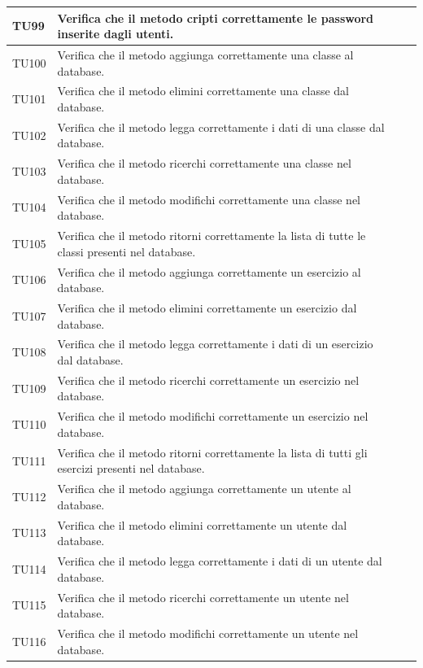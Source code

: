 \begin{longtable}{|>{\centering\arraybackslash}m{1.6cm}|>{\centering\arraybackslash}m{6.41cm}|>{\centering\arraybackslash}m{3.1cm}| c |}
		\rowcolor{LightGray}
		TU99 & Verifica che il metodo cripti correttamente le password inserite dagli utenti.  \\ \hline
		TU100 & Verifica che il metodo aggiunga correttamente una classe al database. \\ \hline
		\rowcolor{LightGray}
		TU101 & Verifica che il metodo elimini correttamente una classe dal database. \\ \hline
		TU102 & Verifica che il metodo legga correttamente i dati di una classe dal database. \\ \hline
		\rowcolor{LightGray}
		TU103 & Verifica che il metodo ricerchi correttamente una classe nel database. \\ \hline
		TU104 & Verifica che il metodo modifichi correttamente una classe nel database. \\ \hline
		\rowcolor{LightGray}
		TU105 & Verifica che il metodo ritorni correttamente la lista di tutte le classi presenti nel database.  \\ \hline	
		TU106 & Verifica che il metodo aggiunga correttamente un esercizio al database. \\ \hline
		\rowcolor{LightGray}
		TU107 & Verifica che il metodo elimini correttamente un esercizio dal database. \\ \hline
		TU108 & Verifica che il metodo legga correttamente i dati di un esercizio dal database. \\ \hline
		\rowcolor{LightGray}
		TU109 & Verifica che il metodo ricerchi correttamente un esercizio nel database. \\ \hline
		TU110 & Verifica che il metodo modifichi correttamente un esercizio nel database. \\ \hline
		\rowcolor{LightGray}
		TU111 & Verifica che il metodo ritorni correttamente la lista di tutti gli esercizi presenti nel database.  \\ \hline	
		TU112 & Verifica che il metodo aggiunga correttamente un utente al database. \\ \hline
		\rowcolor{LightGray}
		TU113 & Verifica che il metodo elimini correttamente un utente dal database. \\ \hline
		TU114 & Verifica che il metodo legga correttamente i dati di un utente dal database. \\ \hline
		\rowcolor{LightGray}
		TU115 & Verifica che il metodo ricerchi correttamente un utente nel database. \\ \hline
		TU116 & Verifica che il metodo modifichi correttamente un utente nel database. \\ \hline

\end{longtable}
